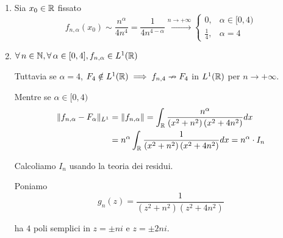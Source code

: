 \Soluzione
\begin{enumerate}
\item Sia $x_{0} \in \RR $ fissato\begin{equation*}
f_{n,\alpha }(x_{0}) \sim \frac{n^{\alpha }}{4n^{4}} = \frac{1}{4n^{4 - \alpha }}\xrightarrow{n\rightarrow + \infty }\begin{cases}
0, & \alpha \in [ 0,4)\\
\frac{1}{4} , & \alpha = 4
\end{cases}
\end{equation*}
\item $\forall n\in \NN  ,\forall \alpha \in [ 0,4] ,f_{n,\alpha } \in L^{1}(\RR)$

Tuttavia se $\alpha = 4$, $F_{4} \notin L^{1}(\RR) \implies f_{n,4} \nrightarrow F_{4}$ in $L^{1}(\RR)$ per $n\rightarrow + \infty $.

Mentre se $\alpha \in [ 0,4)$\begin{equation*}
\begin{aligned}
\Vert f_{n,\alpha } - F_{\alpha }\Vert _{L^{1}} & = \Vert f_{n,\alpha }\Vert = \int _{\RR }\frac{n^{\alpha }}{\left(x^{2} + n^{2}\right)\left(x^{2} + 4n^{2}\right)} dx\\
 & = n^{\alpha }\int _{\RR }\frac{1}{\left(x^{2} + n^{2}\right)\left(x^{2} + 4n^{2}\right)} dx = n^{\alpha } \cdot I_{n}
\end{aligned}
\end{equation*}

Calcoliamo $I_{n}$ usando la teoria dei residui.

Poniamo\begin{equation*}
g_{n}(z) = \frac{1}{\left(z^{2} + n^{2}\right)\left(z^{2} + 4n^{2}\right)}
\end{equation*}

ha $4$ poli semplici in $z = \pm ni$ e $z = \pm 2ni$.

\begin{figure}[htpb]
	\centering
{} %

\begin{tikzpicture}[x = 0.75pt,y = 0.75pt,yscale = -1,xscale = 1]


\end{tikzpicture}
\end{figure}
\end{enumerate}
